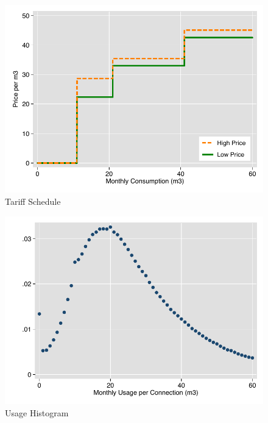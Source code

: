 \documentclass[12pt,table]{article}
\begin{document}
\begin{figure}
\begin{center}
\caption{Tariff Schedule}\label{figure:tariffschedule}
\includegraphics[scale=1]{tables/rs_prices.pdf}
\end{center}
\end{figure}

\begin{figure}
\begin{center}
\caption{Usage Histogram}\label{figure:conshist}
\includegraphics[scale=1]{tables/cons_histogram.pdf}
\end{center}
\end{figure}
\end{document}
